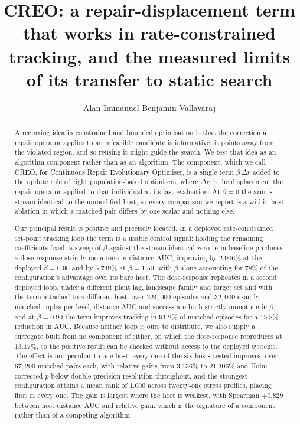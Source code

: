 \documentclass[11pt,a4paper]{article}
\title{CREO: a repair-displacement term that works in rate-constrained\\
tracking, and the measured limits of its transfer to static search}
\author{Alan Immanuel Benjamin Vallavaraj}
\date{}
\begin{document}
\maketitle

\begin{abstract}
A recurring idea in constrained and bounded optimisation is that the correction a repair
operator applies to an infeasible candidate is informative: it points away from the
violated region, and so reusing it might guide the search. We test that idea as an
algorithm component rather than as an algorithm. The component, which we call CREO, for
Continuous Repair Evolutionary Optimiser, is a single term $\beta\,\Delta r$ added to the
update rule of eight population-based optimisers, where $\Delta r$ is the displacement the
repair operator applied to that individual at its last evaluation. At $\beta=0$ the arm is
stream-identical to the unmodified host, so every comparison we report is a within-host
ablation in which a matched pair differs by one scalar and nothing else.

Our principal result is positive and precisely located. In a deployed rate-constrained
set-point tracking loop the term is a usable control signal: holding the remaining
coefficients fixed, a sweep of $\beta$ against the stream-identical zero-term baseline
produces a dose-response strictly monotone in distance AUC, improving by $2.906\%$ at the
deployed $\beta=0.90$ and by $5.749\%$ at $\beta=1.50$, with $\beta$ alone accounting for
$78\%$ of the configuration's advantage over its bare host. The dose-response replicates in
a second deployed loop, under a different plant lag, landscape family and target set and
with the term attached to a different host: over $224{,}000$ episodes and $32{,}000$ exactly
matched tuples per level, distance AUC and success are both strictly monotone in $\beta$,
and at $\beta=0.90$ the term improves tracking in $91.2\%$ of matched episodes for a
$15.8\%$ reduction in AUC. Because neither loop is ours to distribute, we also supply a
surrogate built from no component of either, on which the dose-response reproduces at
$13.17\%$, so the positive result can be checked without access to the deployed systems. The effect is not peculiar to one host: every one of the six hosts tested improves, over $67{,}200$ matched pairs each,
with relative gains from $3.136\%$ to $21.306\%$ and Holm-corrected $p$ below
double-precision resolution throughout, and the strongest configuration attains a mean
rank of $1.000$ across twenty-one stress profiles, placing first in every one. The gain is
largest where the host is weakest, with Spearman $+0.829$ between host distance AUC and
relative gain, which is the signature of a component rather than of a competing algorithm.


\end{abstract}
\end{document}
